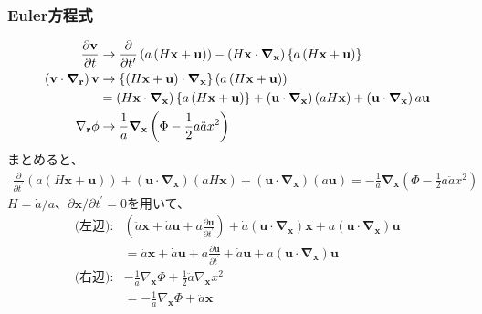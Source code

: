 \documentclass[a4paper,papersize,uplatex,dvipdfmx,10pt]{jsarticle}
\begin{document}
\subsubsection{Euler方程式}
\begin{align}
  \frac{\partial \mathbf{v}}{\partial t} &\to \frac{\partial}{\partial t^{\prime}}\left( a\left( H\mathbf{x}+\mathbf{u} \right) \right) - \left( H\mathbf{x}\cdot\bm{\nabla}_{\mathbf{x}} \right)\left\{ a\left( H\mathbf{x}+\mathbf{u} \right) \right\}\\
  \left( \mathbf{v}\cdot\bm{\nabla}_{\mathbf{r}} \right)\mathbf{v} &\to \left\{ \left( H\mathbf{x}+\mathbf{u} \right)\cdot\bm{\nabla}_{\mathbf{x}} \right\}\left( a\left( H\mathbf{x}+\mathbf{u} \right) \right)\notag\\
  &=\left( H\mathbf{x}\cdot\bm{\nabla}_{\mathbf{x}} \right)\left\{ a\left( H\mathbf{x}+\mathbf{u} \right) \right\} + \left( \mathbf{u}\cdot\bm{\nabla}_{\mathbf{x}} \right)\left( aH\mathbf{x} \right) + \left( \mathbf{u}\cdot\bm{\nabla}_{\mathbf{x}} \right)a\mathbf{u}\\
  \nabla_{\mathbf{r}}\phi &\to \frac{1}{a}\bm{\nabla}_{\mathbf{x}}\left( \Phi - \frac{1}{2}a\ddot{a}x^{2} \right)
\end{align}
まとめると、
\begin{align*}
  \frac{\partial}{\partial t^{\prime}}\left( a\left( H\mathbf{x}+\mathbf{u} \right) \right) + \left( \mathbf{u}\cdot\bm{\nabla}_{\mathbf{x}} \right)\left( aH\mathbf{x} \right) + \left( \mathbf{u}\cdot\bm{\nabla}_{\mathbf{x}} \right)(a\mathbf{u}) = -\frac{1}{a}\bm{\nabla}_{\mathbf{x}}\left( \Phi - \frac{1}{2}a\ddot{a}x^{2} \right)
\end{align*}
$H=\dot{a}/a$、$\partial \mathbf{x}/\partial t^{\prime}=0$を用いて、
\begin{align*}
  \text{(左辺)}: &\left(\ddot{a}\mathbf{x}+\dot{a}\mathbf{u}+a\frac{\partial \mathbf{u}}{\partial t^{\prime}}\right)+\dot{a}\left(\mathbf{u}\cdot\bm{\nabla}_{\mathbf{x}}\right)\mathbf{x}+a\left(\mathbf{u}\cdot\bm{\nabla}_{\mathbf{x}}\right)\mathbf{u}\\
  &= \ddot{a}\mathbf{x} + \dot{a}\mathbf{u} + a\frac{\partial \mathbf{u}}{\partial t^{\prime}} + \dot{a}\mathbf{u} + a\left( \mathbf{u}\cdot\bm{\nabla}_{\mathbf{x}} \right)\mathbf{u}\\
  \text{(右辺)}: &-\frac{1}{a}\nabla_{\mathbf{x}}\Phi + \frac{1}{2}\ddot{a}\nabla_{\mathbf{x}}x^{2}\\
  &= -\frac{1}{a}\nabla_{\mathbf{x}}\Phi + \ddot{a}\mathbf{x}
\end{align*}
\end{document}
